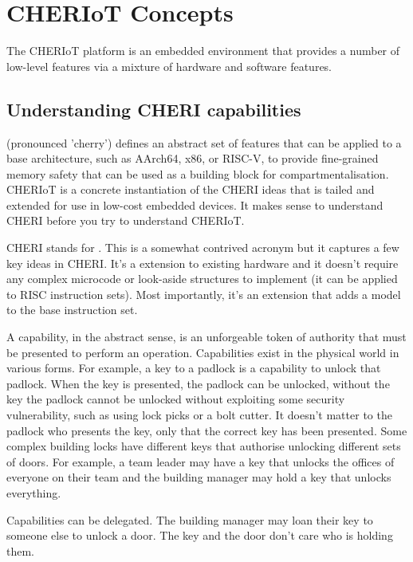 \chapter[label=concepts]{CHERIoT Concepts}

The CHERIoT platform is an embedded environment that provides a number of low-level features via a mixture of hardware and software features.

\section{Understanding CHERI capabilities}

 (pronounced 'cherry') defines an abstract set of features that can be applied to a base architecture, such as AArch64, x86, or RISC-V, to provide fine-grained memory safety that can be used as a building block for compartmentalisation.
CHERIoT is a concrete instantiation of the CHERI ideas that is tailed and extended for use in low-cost embedded devices.
It makes sense to understand CHERI before you try to understand CHERIoT.

CHERI stands for .
This is a somewhat contrived acronym but it captures a few key ideas in CHERI.
It's a extension to existing hardware and it doesn't require any complex microcode or look-aside structures to implement (it can be applied to RISC instruction sets).
Most importantly, it's an extension that adds a  model to the base instruction set.

A capability, in the abstract sense, is an unforgeable token of authority that must be presented to perform an operation.
Capabilities exist in the physical world in various forms.
For example, a key to a padlock is a capability to unlock that padlock.
When the key is presented, the padlock can be unlocked, without the key the padlock cannot be unlocked without exploiting some security vulnerability, such as using lock picks or a bolt cutter.
It doesn't matter to the padlock who presents the key, only that the correct key has been presented.
Some complex building locks have different keys that authorise unlocking different sets of doors.
For example, a team leader may have a key that unlocks the offices of everyone on their team and the building manager may hold a key that unlocks everything.

Capabilities can be delegated.
The building manager may loan their key to someone else to unlock a door.
The key and the door don't care who is holding them.

